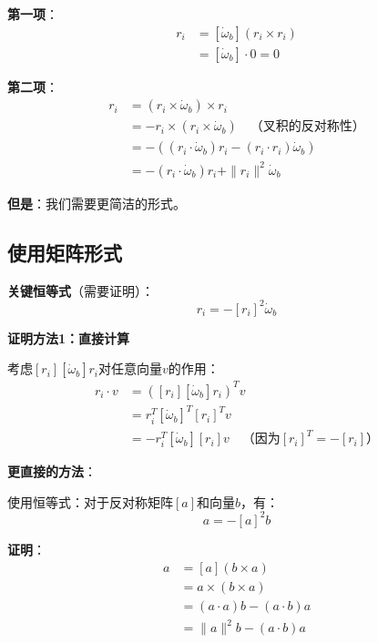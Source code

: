 \documentclass[12pt,a4paper]{article}
\begin{document}
\textbf{第一项}：
\begin{align}
[\dot{\omega}_b][r_i] r_i &= [\dot{\omega}_b](r_i \times r_i) \\
&= [\dot{\omega}_b] \cdot 0 = 0
\end{align}

\textbf{第二项}：
\begin{align}
[r_i \times \dot{\omega}_b] r_i &= (r_i \times \dot{\omega}_b) \times r_i \\
&= -r_i \times (r_i \times \dot{\omega}_b) \quad \text{（叉积的反对称性）} \\
&= -((r_i \cdot \dot{\omega}_b) r_i - (r_i \cdot r_i) \dot{\omega}_b) \\
&= -(r_i \cdot \dot{\omega}_b) r_i + \|r_i\|^2 \dot{\omega}_b
\end{align}

\textbf{但是}：我们需要更简洁的形式。

\subsection{使用矩阵形式}

\textbf{关键恒等式}（需要证明）：
\begin{equation}
[r_i][\dot{\omega}_b] r_i = -[r_i]^2 \dot{\omega}_b
\end{equation}

\textbf{证明方法1：直接计算}

考虑$[r_i][\dot{\omega}_b] r_i$对任意向量$v$的作用：
\begin{align}
[r_i][\dot{\omega}_b] r_i \cdot v &= ([r_i][\dot{\omega}_b] r_i)^T v \\
&= r_i^T [\dot{\omega}_b]^T [r_i]^T v \\
&= -r_i^T [\dot{\omega}_b] [r_i] v \quad \text{（因为$[r_i]^T = -[r_i]$）}
\end{align}

\textbf{更直接的方法}：

使用恒等式：对于反对称矩阵$[a]$和向量$b$，有：
\begin{equation}
[a][b] a = -[a]^2 b
\end{equation}

\textbf{证明}：
\begin{align}
[a][b] a &= [a](b \times a) \\
&= a \times (b \times a) \\
&= (a \cdot a) b - (a \cdot b) a \\
&= \|a\|^2 b - (a \cdot b) a
\end{align}
\end{document}
